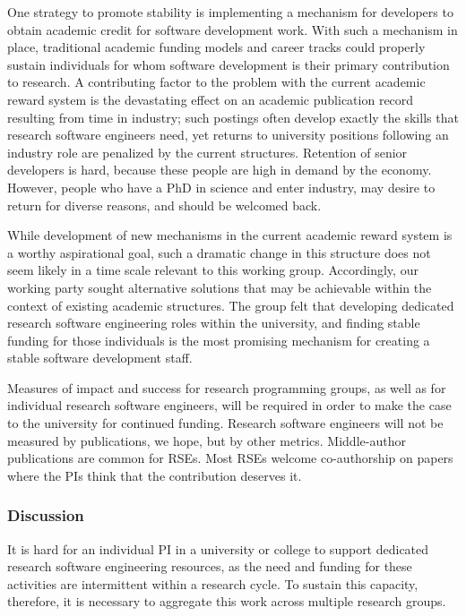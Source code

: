 One strategy to promote stability is implementing a mechanism for developers to
obtain academic credit for software development work. With such a mechanism in
place, traditional academic funding models and career tracks could properly
sustain individuals for whom software development is their primary contribution
to research. A contributing factor to the problem with the current academic
reward system is the devastating effect on an academic publication record
resulting from time in industry; such postings often develop exactly the skills
that research software engineers need, yet returns to university positions
following an industry role are penalized by the current structures. Retention of
senior developers is hard, because these people are high in demand by the
economy. However, people who have a PhD in science and enter industry, may
desire to return for diverse reasons, and should be welcomed back.

While development of new mechanisms in the current academic reward system is a
worthy aspirational goal, such a dramatic change in this structure does not seem
likely in a time scale relevant to this working group. Accordingly, our working
party sought alternative solutions that may be achievable within the context of
existing academic structures. The group felt that developing dedicated research
software engineering roles within the university, and finding stable funding for
those individuals is the most promising mechanism for creating a stable software
development staff.

Measures of impact and success for research programming groups, as well as for
individual research software engineers, will be required in order to make the
case to the university for continued funding. Research software engineers will
not be measured by publications, we hope, but by other metrics. Middle-author
publications are common for RSEs. Most RSEs welcome co-authorship on papers
where the PIs think that the contribution deserves it.

\subsubsection{Discussion}

It is hard for an individual PI in a university or college to support dedicated
research software engineering resources, as the need and funding for these
activities are intermittent within a research cycle. To sustain this capacity,
therefore, it is necessary to aggregate this work across multiple research
groups.

